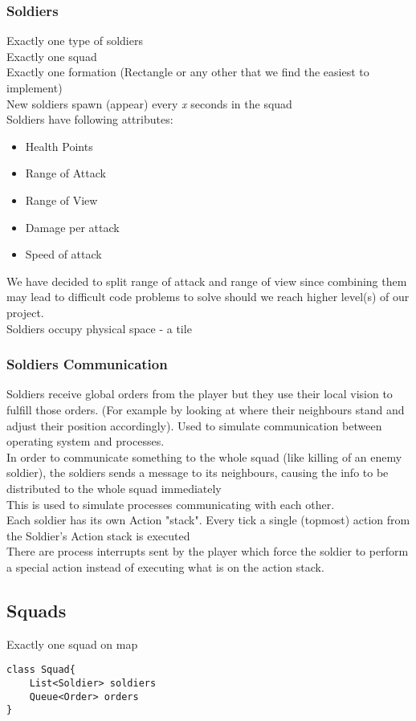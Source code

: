\documentclass{article}
\begin{document}
\subsubsection{Soldiers}
Exactly one type of soldiers \\ 
Exactly one squad \\
Exactly one formation (Rectangle or any other that we find the easiest to implement) \\
New soldiers spawn (appear) every \textit{x} seconds in the squad \\
Soldiers have following attributes: 
\begin{itemize}
\item Health Points
\item Range of Attack 
\item Range of View
\item Damage per attack 
\item Speed of attack
\end{itemize}
We have decided to split range of attack and range of view since combining them may lead to difficult code problems to solve should we reach higher level(s) of our project. \\
Soldiers occupy physical space - a tile \\ 

\subsubsection{Soldiers Communication}
Soldiers receive global orders from the player but they use their local vision to fulfill those orders. (For example by looking at where their neighbours stand and adjust their position accordingly). Used to simulate communication between operating system and processes. \\ 
In order to communicate something to the whole squad (like killing of an enemy soldier), the soldiers sends a message to its neighbours, causing the info to be distributed to the whole squad immediately
\\ This is used to simulate processes communicating with each other. \\ 
Each soldier has its own Action "stack". Every tick a single (topmost) action from the Soldier's Action stack is executed
\\
There are process interrupts sent by the player which force the soldier to perform a special action instead of executing what is on the action stack.

\subsection{Squads}
Exactly one squad on map \\
\begin{lstlisting}[caption={Pseudo-code for Squad class}]
class Squad{
    List<Soldier> soldiers
    Queue<Order> orders
}
\end{lstlisting}
\end{document}
